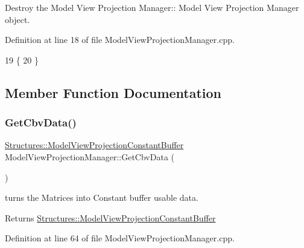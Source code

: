 Destroy the Model View Projection Manager\+:\+: Model View Projection Manager object. 



Definition at line 18 of file Model\+View\+Projection\+Manager.\+cpp.


\begin{DoxyCode}
19 \{
20 \}
\end{DoxyCode}


\subsection{Member Function Documentation}
\mbox{\label{class_model_view_projection_manager_a7f7cb0b403869c68d96b1c3925cd930c}} 
\subsubsection{\texorpdfstring{Get\+Cbv\+Data()}{GetCbvData()}}
{\footnotesize\ttfamily \mbox{\hyperlink{struct_structures_1_1_model_view_projection_constant_buffer}{Structures\+::\+Model\+View\+Projection\+Constant\+Buffer}} Model\+View\+Projection\+Manager\+::\+Get\+Cbv\+Data (\begin{DoxyParamCaption}{ }\end{DoxyParamCaption})}



turns the Matrices into Constant buffer usable data. 

\begin{DoxyReturn}{Returns}
\mbox{\hyperlink{struct_structures_1_1_model_view_projection_constant_buffer}{Structures\+::\+Model\+View\+Projection\+Constant\+Buffer}} 
\end{DoxyReturn}


Definition at line 64 of file Model\+View\+Projection\+Manager.\+cpp.


